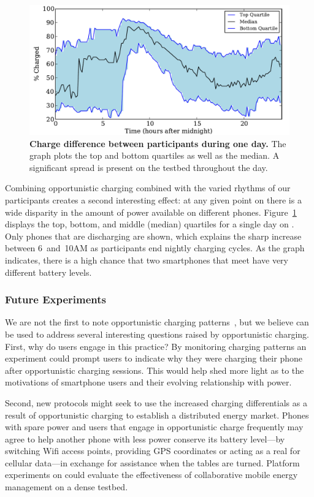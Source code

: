 \begin{figure}[t]
\includegraphics[width=\textwidth]{./figures/power/opportunistic_charging/max_difference/graph.pdf}
\caption{\textbf{Charge difference between participants during one day.} The
graph plots the top and bottom quartiles as well as the median. A significant
spread is present on the testbed throughout the day.}
\label{fig-opportunisticspread}
\end{figure}

Combining opportunistic charging combined with the varied rhythms of our
participants creates a second interesting effect: at any given point on
\PhoneLab{} there is a wide disparity in the amount of power available on
different phones. Figure~\ref{fig-opportunisticspread} displays the top,
bottom, and middle (median) quartiles for a single day on \PhoneLab{}. Only
phones that are discharging are shown, which explains the sharp increase
between 6~and~10AM as participants end nightly charging cycles.  As the graph
indicates, there is a high chance that two smartphones that meet have very
different battery levels.

\subsubsection{Future Experiments}

We are not the first to note opportunistic charging
patterns~\cite{banerjee:ubicomp:2007, rahmati:mobilehci:2007}, but we believe
\PhoneLab{} can be used to address several interesting questions raised by
opportunistic charging. First, why do users engage in this practice? By
monitoring charging patterns an experiment could prompt users to indicate why
they were charging their phone after opportunistic charging sessions. This
would help shed more light as to the motivations of smartphone users and
their evolving relationship with power.

Second, new protocols might seek to use the increased charging differentials
as a result of opportunistic charging to establish a distributed energy
market. Phones with spare power and users that engage in opportunistic charge
frequently may agree to help another phone with less power conserve its
battery level---by switching Wifi access points, providing GPS coordinates or
acting as a real for cellular data---in exchange for assistance when the
tables are turned. Platform experiments on \PhoneLab{} could evaluate the
effectiveness of collaborative mobile energy management on a dense testbed.
